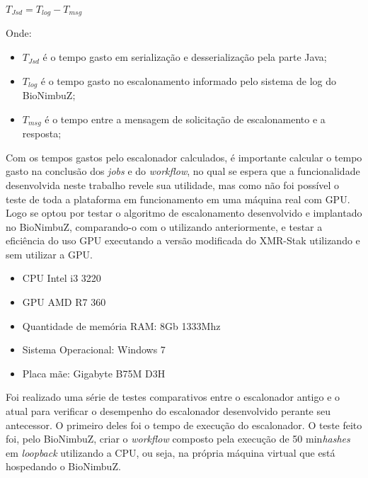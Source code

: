 \centerline{ $T_{Jsd} = T_{log} - T_{msg}$ }

Onde: 
\begin{itemize}
	\item $T_{Jsd}$ é o tempo gasto em serialização e desserialização pela parte Java;
	\item $T_{log}$ é o tempo gasto no escalonamento informado pelo sistema de log do BioNimbuZ;
	\item $T_{msg}$ é o tempo entre a mensagem de solicitação de escalonamento e a resposta;
\end{itemize}

Com os tempos gastos pelo escalonador calculados, é importante calcular o tempo gasto na conclusão dos \textit{jobs} e do \textit{workflow}, no qual se espera que a funcionalidade desenvolvida neste trabalho revele sua utilidade, mas como não foi possível o teste de toda a plataforma em funcionamento em uma máquina real com \acrshort{GPU}. Logo se optou por testar o algoritmo de escalonamento desenvolvido e implantado no BioNimbuZ, comparando-o com o utilizando anteriormente, e testar a eficiência do uso GPU executando a versão modificada do XMR-Stak utilizando e sem utilizar a \acrshort{GPU}.

\begin{itemize}
	\item \acrshort{CPU} Intel i3 3220
	\item \acrshort{GPU} AMD R7 360
	\item Quantidade de memória \acrshort{RAM}: 8Gb 1333Mhz
	\item Sistema Operacional: Windows 7
	\item Placa mãe: Gigabyte B75M D3H
\end{itemize}

Foi realizado uma série de testes comparativos entre o escalonador antigo e o atual para verificar o desempenho do escalonador desenvolvido perante seu antecessor. O primeiro deles foi o tempo de execução do escalonador. O teste feito foi, pelo BioNimbuZ, criar o \textit{workflow} composto pela execução de 50 min\textit{hashes} em \textit{loopback} utilizando a \acrshort{CPU}, ou seja, na própria máquina virtual que está hospedando o BioNimbuZ.

